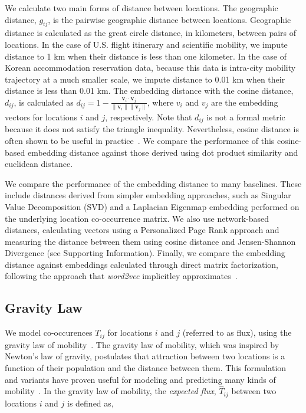 \documentclass[12pt]{article} %
\def\SI{Supporting Information}
\begin{document}
We calculate two main forms of distance between locations.
The geographic distance, $g_{ij}$, is the pairwise geographic distance between locations.
Geographic distance is calculated as the great circle distance, in kilometers, between pairs of locations.
In the case of U.S. flight itinerary and scientific mobility, we impute distance to 1 km when their distance is less than one kilometer.
In the case of Korean accommodation reservation data, because this data is intra-city mobility trajectory at a much smaller scale, we impute distance to 0.01 km when their distance is less than 0.01 km.
The embedding distance with the cosine distance, $d_{ij}$, is calculated as $d_{ij} = 1 - \frac{\bm{v}_{i} \cdot \bm{v}_{j}}{\lVert \bm{v}_{i} \rVert \lVert \bm{v}_{j} \rVert}$,
where $v_i$ and $v_j$ are the embedding vectors for locations $i$ and $j$, respectively.
Note that $d_{ij}$ is not a formal metric because it does not satisfy the triangle inequality.
Nevertheless, cosine distance is often shown to be useful in practice~\autocite{lerman2007embedding, brown1970migration, kim2018functional}.
We compare the performance of this cosine-based embedding distance against those derived using dot product similarity and euclidean distance.

We compare the performance of the embedding distance to many baselines.
These include distances derived from simpler embedding approaches, such as Singular Value Decomposition (SVD) and a Laplacian Eigenmap embedding performed on the underlying location co-occurrence matrix.
We also use network-based distances, calculating vectors using a Personalized Page Rank approach and measuring the distance between them using cosine distance and Jensen-Shannon Divergence (see \SI).
Finally, we compare the embedding distance against embeddings calculated through direct matrix factorization, following the approach that \textit{word2vec} implicitley approximates~\autocite{levy2014neural}.


%
%
\subsection*{Gravity Law}

We model co-occurences $T_{ij}$ for locations $i$ and $j$ (referred to as flux), using the gravity law of mobility~\autocite{zipf1946gravity}.
The gravity law of mobility, which was inspired by Newton's law of gravity, postulates that attraction between two locations is a function of their population and the distance between them.
This formulation and variants have proven useful for modeling and predicting many kinds of mobility~\autocite{jung2008highwaygravity, curiel2018citygravity, truscott2012epidemicgravity, hong2016busgravity}.
In the gravity law of mobility, the \textit{expected flux}, $\hat{T}_{ij}$ between two locations $i$ and $j$ is defined as,
\end{document}
